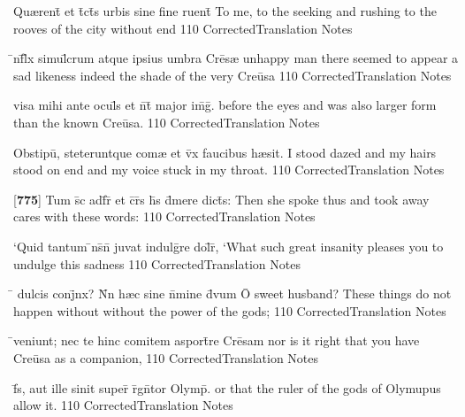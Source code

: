 \latline
  {Qu{\ae}rent\={\macron {\i}} et t\={}ct\={\macron {\i}}s urbis sine fine ruent\={\macron {\i}}}
  { To me, to the seeking and rushing to the rooves of the city without end }
  {110}
  { CorrectedTranslation }
  { Notes }


\latline
  {\={\macron {\i}}nf\={}l\={\macron {\i}}x simul\={}crum atque ipsius umbra Cre\={}s{\ae}}
  { unhappy man there seemed to appear a sad likeness indeed the shade of the very Cre\={u}sa }
  {110}
  { CorrectedTranslation }
  { Notes }


\latline
  {visa mihi ante ocul\={}s et n\={}t\={} major im\={}g\={}.}
  { before the eyes and was also larger form than the known Cre\={u}sa. }
  {110}
  { CorrectedTranslation }
  { Notes }


\latline
  {Obstipu\={\macron {\i}}, steteruntque com{\ae} et v\={}x faucibus h{\ae}sit.}
  { I stood dazed and my hairs stood on end and my voice stuck in my throat. }
  {110}
  { CorrectedTranslation }
  { Notes }


\latline
  {[\textbf{775}] Tum s\={\macron {\i}}c adf\={}r\={\macron {\i}} et c\={}r\={}s h\={\macron {\i}}s d\={}mere dict\={\macron {\i}}s:}
  { Then she spoke thus and took away cares with these words: }
  {110}
  { CorrectedTranslation }
  { Notes }


\latline
  {`Quid tantum \={\macron {\i}}ns\={}n\={} juvat indulg\={}re dol\={}r\={\macron {\i}},}
  { `What such great insanity pleases you to undulge this sadness }
  {110}
  { CorrectedTranslation }
  { Notes }


\latline
  {\={} dulcis conj\={}nx? N\={}n h{\ae}c sine n\={}mine d\={\macron {\i}}vum}
  { \={O} sweet husband?  These things do not happen without without the power of the gods; }
  {110}
  { CorrectedTranslation }
  { Notes }


\latline
  {\={}veniunt; nec te hinc comitem asport\={}re Cre\={}sam}
  { nor is it right that you have Cre\={u}sa as a companion, }
  {110}
  { CorrectedTranslation }
  { Notes }


\latline
  {f\={}s, aut ille sinit super\={\macron {\i}} r\={}gn\={}tor Olymp\={\macron {\i}}.}
  { or that the ruler of the gods of Olymupus allow it. }
  {110}
  { CorrectedTranslation }
  { Notes }


